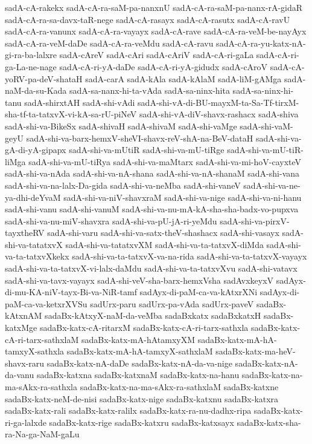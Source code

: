 {sadA-cA-rakekx
sadA-cA-ra-saM-pa-nanxnU
sadA-cA-ra-saM-pa-nanx-rA-gidaR
sadA-cA-ra-sa-davx-taR-nege
sadA-cA-rasayx
sadA-cA-rasutx
sadA-cA-ravU
sadA-cA-ra-vanunx
sadA-cA-ra-vayayx
sadA-cA-rave
sadA-cA-ra-veM-be-nayAyx
sadA-cA-ra-veM-daDe
sadA-cA-ra-veMdu
sadA-cA-ravu
sadA-cA-ra-yu-katx-nA-gi-ra-ba-lalxre
sadA-cAreV
sadA-cAri
sadA-cAriV
sadA-cA-ri-gaLa
sadA-cA-ri-ga-La-ne-nage
sadA-cA-ri-yA-daDe
sadA-cA-ri-yA-gidudx
sadA-cAroV
sadA-cA-yoRV-pa-deV-shataH
sadA-carA
sadA-kAla
sadA-kAlaM
sadA-liM-gAMga
sadA-naM-da-su-Kada
sadA-sa-nanx-hi-ta-vAda
sadA-sa-ninx-hita
sadA-sa-ninx-hi-tanu
sadA-shirxtAH
sadA-shi-vAdi
sadA-shi-vA-di-BU-mayxM-ta-Sa-Tf-tirxM-sha-tf-ta-tatxvX-vi-kA-sa-rU-piNeV
sadA-shi-vA-diV-shavx-rashacx
sadA-shiva
sadA-shi-va-BikeSx
sadA-shivaH
sadA-shivaM
sadA-shi-vaMge
sadA-shi-vaM-geyU
sadA-shi-va-barx-hemxV-sheVI-shavx-reV-shA-na-BeV-dataH
sadA-shi-va-gA-di-yA-gipapx
sadA-shi-va-mUtiR
sadA-shi-va-mU-tiRge
sadA-shi-va-mU-tiR-liMga
sadA-shi-va-mU-tiRya
sadA-shi-va-maMtarx
sadA-shi-va-mi-hoV-cayxteV
sadA-shi-va-nAda
sadA-shi-va-nA-shana
sadA-shi-va-nA-shanaM
sadA-shi-vana
sadA-shi-va-na-lalx-Da-gida
sadA-shi-va-neMba
sadA-shi-vaneV
sadA-shi-va-ne-ya-dhi-deYvaM
sadA-shi-va-niV-shavxraM
sadA-shi-va-nige
sadA-shi-va-ni-hanu
sadA-shi-vanu
sadA-shi-vanuM
sadA-shi-va-nu-mA-kA-sha-sha-badx-vo-pupxva
sadA-shi-va-nu-miV-shavxra
sadA-shi-va-pU-jA-ri-yeMdu
sadA-shi-va-pirxV-tayxtheRV
sadA-shi-varu
sadA-shi-va-satx-theV-shashacx
sadA-shi-vasayx
sadA-shi-va-tatatxvX
sadA-shi-va-tatatxvXM
sadA-shi-va-ta-tatxvX-diMda
sadA-shi-va-ta-tatxvXkekx
sadA-shi-va-ta-tatxvX-va-na-rida
sadA-shi-va-ta-tatxvX-vayayx
sadA-shi-va-ta-tatxvX-vi-lalx-daMdu
sadA-shi-va-ta-tatxvXvu
sadA-shi-vatavx
sadA-shi-va-tavx-vayayx
sadA-shi-veV-sha-barx-hemxVsha
sadAvxkeyxV
sadAyx-di-mu-KA-niV-tayx-Bi-va-NiR-tamf
sadAyx-di-paM-ca-va-kAtxrXNi
sadAyx-di-paM-ca-va-ketxrXVSu
sadUrx-paru
sadUrx-pa-vAda
sadUrx-paveV
sadaBx-kAtxnAM
sadaBx-kAtxyX-naM-da-veMba
sadaBxkatx
sadaBxkatxH
sadaBx-katxMge
sadaBx-katx-cA-ritarxM
sadaBx-katx-cA-ri-tarx-sathxla
sadaBx-katx-cA-ri-tarx-sathxlaM
sadaBx-katx-mA-hAtamxyXM
sadaBx-katx-mA-hA-tamxyX-sathxla
sadaBx-katx-mA-hA-tamxyX-sathxlaM
sadaBx-katx-ma-heV-shavx-raru
sadaBx-katx-nA-daDe
sadaBx-katx-nA-da-va-nige
sadaBx-katx-nA-da-vanu
sadaBx-katxna
sadaBx-katxnaM
sadaBx-katx-na-hanu
sadaBx-katx-na-ma-sAkx-ra-sathxla
sadaBx-katx-na-ma-sAkx-ra-sathxlaM
sadaBx-katxne
sadaBx-katx-neM-de-nisi
sadaBx-katx-nige
sadaBx-katxnu
sadaBx-katxra
sadaBx-katx-rali
sadaBx-katx-ralilx
sadaBx-katx-ra-nu-dadhx-ripa
sadaBx-katx-ri-ga-lalxde
sadaBx-katx-rige
sadaBx-katxru
sadaBx-katxsayx
sadaBx-katx-sha-ra-Na-ga-NaM-gaLu
}
